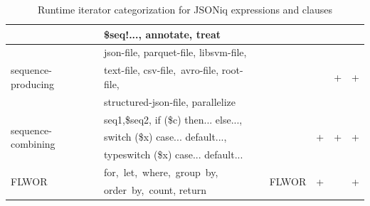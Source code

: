 \begin{table}[h!]
{\begin{tabular}{|l|l|l|l|l|l|}
		\cline{2-2}
		& \$seq!..., annotate, treat                                  &                                                                                                                        &                    &                    &                     \\ 
		\hline
		\multirow{3}{*}{sequence-producing}    & json-file, parquet-file, libsvm-file,~                      & \multirow{3}{*}{}                                                                                                      & \multirow{3}{*}{}  & \multirow{3}{*}{+} & \multirow{3}{*}{+}  \\ 
		\cline{2-2}
		& text-file, csv-file,~avro-file, root- file,                 &                                                                                                                        &                    &                    &                     \\ 
		\cline{2-2}
		& structured-json-file, parallelize                           &                                                                                                                        &                    &                    &                     \\ 
		\hline
		\multirow{3}{*}{sequence-combining}    & seq1,\$seq2, if (\$c) then... else...,                      & \multirow{3}{*}{}                                                                                                      & \multirow{3}{*}{+} & \multirow{3}{*}{+} & \multirow{3}{*}{+}  \\ 
		\cline{2-2}
		& switch (\$x) case... default...,                            &                                                                                                                        &                    &                    &                     \\ 
		\cline{2-2}
		& typeswitch (\$x) case... default...                         &                                                                                                                        &                    &                    &                     \\ 
		\hline
		\multirow{2}{*}{FLWOR}                 & for,~let,~where,~group~by,~                                 & \multirow{2}{*}{FLWOR}                                                                                                 & \multirow{2}{*}{+} & \multirow{2}{*}{}  & \multirow{2}{*}{+}  \\ 
		\cline{2-2}
		& order~by,~count, return                                     &                                                                                                                        &                    &                    &                     \\
		\hline
	\end{tabular}}
	\caption{Runtime iterator categorization for JSONiq expressions and clauses}
	\label{tab:RuntimeCategoriesMapping}
	\vspace{-3mm}
\end{table}

